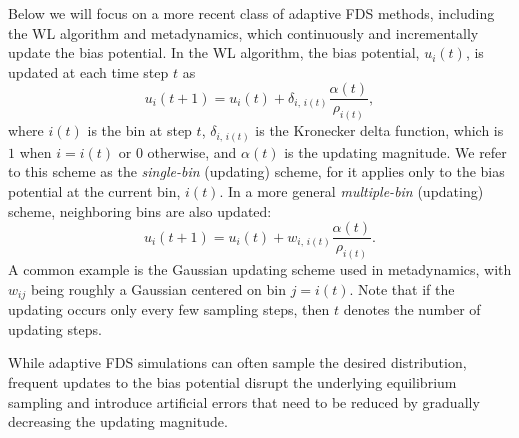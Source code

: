 \documentclass[reprint, superscriptaddress, floatfix]{revtex4-1}
\begin{document}
Below we will focus on a more recent class of adaptive FDS methods,
including the WL algorithm\cite{wang2001, wang2001pre}
and metadynamics\cite{huber1994, laio2002, *laio2008, *barducci2011, *sutto2012},
which
continuously and incrementally update the bias potential.
%
%
In the WL algorithm\cite{wang2001, wang2001pre},
the bias potential, $u_i(t)$, is updated
at each time step $t$ as
%
\begin{equation}
  u_i(t+1)
  =
  u_i(t)
  +
  \delta_{i, \, i(t)}
  \frac{ \alpha(t) } { \rho_{i(t)} }
  ,
\label{eq:wl_update}
\end{equation}
%
where $i(t)$ is the bin at step $t$,
$\delta_{i, \, i(t)}$ is the Kronecker delta function,
which is $1$ when $i = i(t)$ or $0$ otherwise,
and $\alpha(t)$ is the updating magnitude.
%
We refer to this scheme as
the \emph{single-bin} (updating) scheme,
for it applies only to the bias potential
at the current bin, $i(t)$.
%
In a more general
\emph{multiple-bin} (updating) scheme,
neighboring bins are also updated:
%
\begin{equation}
  u_i(t+1)
  =
  u_i(t)
  +
  w_{i, \, i(t)}
  \frac{ \alpha(t) }
       { \rho_{i(t)} }
  .
  \label{eq:mbin_update}
\end{equation}
%
A common example is the Gaussian updating scheme used in metadynamics,
with $w_{ij}$ being roughly a Gaussian centered on bin $j = i(t)$.
%
Note that if the updating occurs
only every few sampling steps,
then $t$ denotes the number of updating steps.




While adaptive FDS simulations
can often sample the desired distribution,
frequent updates to the bias potential
disrupt the underlying equilibrium sampling
and introduce artificial errors that need to be
reduced by gradually decreasing the updating magnitude.\cite{
  belardinelli2007, *belardinelli2007jcp, *belardinelli2008, *belardinelli2016,
  zhou2005, morozov2007, morozov2009, zhou2008, min2007,
  poulain2006, liang2007,
  crespo2010, *atchade2011, *fort2015}
\end{document}
